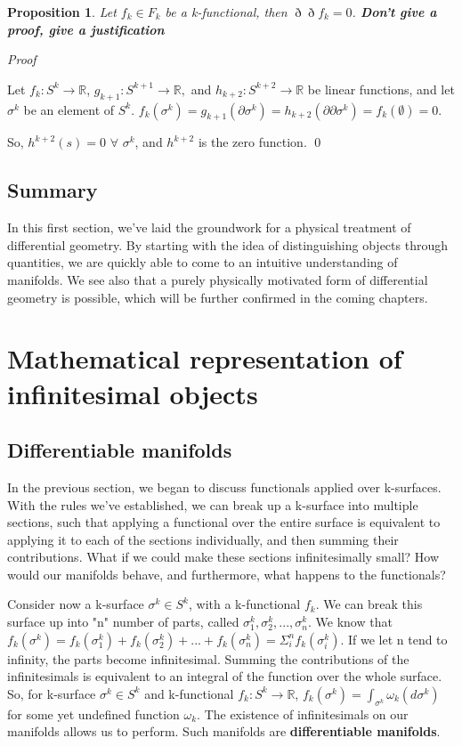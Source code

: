 \documentclass{book}
\newtheorem{prop}[equation]{Proposition}
\renewenvironment{proof}{\emph{Proof}}{\qed}
\begin{document}
\begin{prop}
	Let $f_k \in F_k$ be a k-functional, then $\eth\eth f_k = 0 $. \textbf{\textit{Don't give a proof, give a justification}}
	
	
\end{prop}
\begin{proof}

	Let $f_k : S^k \to \mathbb{R}$, $g_{k+1} : S^{k+1} \to \mathbb{R},$ and $h_{k+2}: S^{k+2} \to \mathbb{R}$ be linear functions, and let $\sigma^k$ be an element of $S^k$. $f_k(\sigma^k) = g_{k+1}(\partial \sigma^k) = h_{k+2}(\partial\partial \sigma^k) = f_k(\emptyset) = 0$. 
	
	So, $h^{k+2}(s) = 0$ $\forall$ $\sigma^k$, and $h^{k+2}$ is the zero function. 
\end{proof}

\section{Summary}


In this first section, we've laid the groundwork for a physical treatment of differential geometry. By starting with the idea of distinguishing objects through quantities, we are quickly able to come to an intuitive understanding of manifolds. We see also that a purely physically motivated form of differential geometry is possible, which will be further confirmed in the coming chapters. 


\chapter{Mathematical representation of infinitesimal objects}


\section{Differentiable manifolds}

In the previous section, we began to discuss functionals applied over k-surfaces. With the rules we've established, we can break up a k-surface into multiple sections, such that applying a functional over the entire surface is equivalent to applying it to each of the sections individually, and then summing their contributions. What if we could make these sections infinitesimally small? How would our manifolds behave, and furthermore, what happens to the functionals?

Consider now a k-surface $\sigma^k \in S^k$, with a k-functional $f_k$. We can break this surface up into "n" number of parts, called $\sigma^k_1, \sigma^k_2, ..., \sigma^k_n$. We know that $f_k(\sigma^k) = f_k(\sigma^k_1) + f_k(\sigma^k_2) + ... + f_k(\sigma^k_n) = \Sigma^n_if_k(\sigma^k_i)$. If we let n tend to infinity, the parts become infinitesimal. Summing the contributions of the infinitesimals is equivalent to an integral of the function over the whole surface. So, for k-surface $\sigma^k \in S^k$ and k-functional $f_k: S^k \to \mathbb{R}$, $f_k(\sigma^k) = \int_{\sigma^k}\omega_k(d\sigma^k)$ for some yet undefined function $\omega_k$. The existence of infinitesimals on our manifolds allows us to perform. Such manifolds are \textbf{differentiable manifolds}. 
\end{document}
